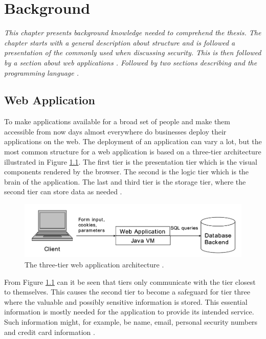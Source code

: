 \chapter{Background}
\label{Background}
\textit{This chapter presents background knowledge needed to comprehend the thesis. The chapter starts with a general description about \textit{} structure and is followed a presentation of the \textit{} commonly used when discussing security. This is then followed by a section about  web applications \textit{}. Followed by two sections describing \textit{} and the programming language \textit{}.}



\section{Web Application}
\label{WebApplication}
To make applications available for a broad set of people and make them accessible from now days almost everywhere do businesses deploy their applications on the web. The deployment of an application can vary a lot, but the most common structure for a web application is based on a three-tier architecture illustrated in Figure \ref{fig:webApplication-Haldar}. The first tier is the presentation tier which is the visual components rendered by the browser. The second is the logic tier which is the brain of the application. The last and third tier is the storage tier, where the second tier can store data as needed \parencite{JustinClarke-Salt2009SIAa}.

\begin{figure}[H]
  \centering
  \includegraphics[width=\textwidth]{images/webApplication-Haldar.png}
  \caption{The three-tier web application architecture \cite{Haldar}.}
  \label{fig:webApplication-Haldar}
\end{figure}

From Figure \ref{fig:webApplication-Haldar} can it be seen that tiers only communicate with the tier closest to themselves. This causes the second tier to become a safeguard for tier three where the valuable and possibly sensitive information is stored. This essential information is mostly needed for the application to provide its intended service. Such information might, for example, be name, email, personal security numbers and credit card information \parencite{JustinClarke-Salt2009SIAa}.

